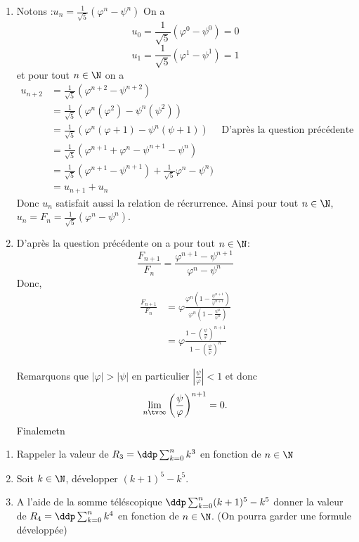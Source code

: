 \documentclass[a4paper, 11pt,reqno]{article}
\begin{document}
\begin{correction}
\begin{enumerate}
\item  Notons  :$u_n =\frac{1}{\sqrt{5}}(\varphi^n-\psi^n)$ 
On a 
$$u_0= \frac{1}{\sqrt{5}}(\varphi^0-\psi^0)=0$$
$$u_1= \frac{1}{\sqrt{5}}(\varphi^1-\psi^1)=1$$
et pour tout $n\in\N$ on a 
\begin{align*}
u_{n+2} &= \frac{1}{\sqrt{5}}(\varphi^{n+2}-\psi^{n+2}) \\
			&= \frac{1}{\sqrt{5}}(\varphi^n (\varphi^2)-\psi^n (\psi^2) ) \\
			&= \frac{1}{\sqrt{5}}(\varphi^n (\varphi +1)-\psi^n (\psi +1)  ) \quad \text{ D'après la question précédente} \\			
			&= \frac{1}{\sqrt{5}}(\varphi^{n+1} +\varphi^n-\psi^{n+1} -\psi^n   ) \\
			&= \frac{1}{\sqrt{5}}(\varphi^{n+1} -\psi^{n+1}) +  \frac{1}{\sqrt{5}} \varphi^n-\psi^n   ) \\
			&=u_{n+1}+u_n
\end{align*}
Donc $u_n$ satisfait aussi la relation de récrurrence. 
Ainsi  pour tout $n\in \N$, $u_n=F_n= \frac{1}{\sqrt{5}}(\varphi^n-\psi^n)$. 


\item D'après la question précédente on a pour tout $n\in \N$: 
$$\frac{F_{n+1}}{F_n} =  \frac{\varphi^{n+1}-\psi^{n+1}}{\varphi^n-\psi^n}$$
Donc,
\begin{align*}
\frac{F_{n+1}}{F_n} &=\varphi \frac{\varphi^{n}\left(1-\frac{\psi^{n+1}}{\varphi^{n+1}}\right)}{\varphi^n\left(1-\frac{\psi^n}{\varphi^n}\right)}\\
&=\varphi \frac{1-\left(\frac{\psi}{\varphi}\right)^{n+1}}{1-\left(\frac{\psi}{\varphi}\right)^n}
\end{align*}


Remarquons que $|\varphi| >|\psi|$ en particulier $|\frac{\psi}{\varphi}|<1$ et donc 
$$\lim_{n\tv \infty} \left(\frac{\psi}{\varphi}\right)^{n+1} =0.$$
Finalemetn 
\begin{center}
\end{center}

\end{enumerate}

\end{correction}






\begin{exercice}
\begin{enumerate}
\item Rappeler  la valeur  de $ R_3=\ddp \sum_{k=0}^n k^3$ en fonction de $n\in \N$
\item Soit $k\in \N$, développer $(k+1)^5 -k^5$. 
\item A l'aide de la  somme téléscopique  $\ddp \sum_{k=0}^n(k+1)^5 -k^5$ donner la valeur de 
$R_4= \ddp \sum_{k=0}^n k^4$  en fonction de $n\in \N$.  (On pourra garder une formule développée) 



\end{enumerate}
\end{exercice}
\end{document}
